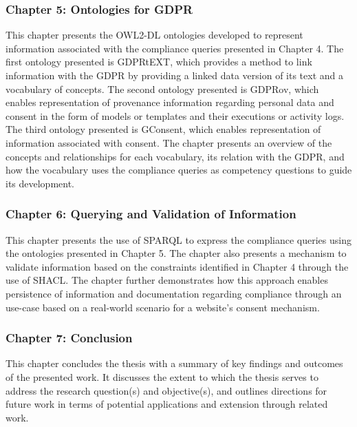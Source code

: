 \subsubsection{Chapter 5: Ontologies for GDPR}
This chapter presents the OWL2-DL ontologies developed to represent information associated with the compliance queries presented in Chapter 4. The first ontology presented is GDPRtEXT, which provides a method to link information with the GDPR by providing a linked data version of its text and a vocabulary of concepts. The second ontology presented is GDPRov, which enables representation of provenance information regarding personal data and consent in the form of models or templates and their executions or activity logs. The third ontology presented is GConsent, which enables representation of information associated with consent. The chapter presents an overview of the concepts and relationships for each vocabulary, its relation with the GDPR, and how the vocabulary uses the compliance queries as competency questions to guide its development.

\subsubsection{Chapter 6: Querying and Validation of Information}
This chapter presents the use of SPARQL to express the compliance queries using the ontologies presented in Chapter 5. The chapter also presents a mechanism to validate information based on the constraints identified in Chapter 4 through the use of SHACL. The chapter further demonstrates how this approach enables persistence of information and documentation regarding compliance through an use-case based on a real-world scenario for a website's consent mechanism.

\subsubsection{Chapter 7: Conclusion}
This chapter concludes the thesis with a summary of key findings and outcomes of the presented work. It discusses the extent to which the thesis serves to address the research question(s) and objective(s), and outlines directions for future work in terms of potential applications and extension through related work.
